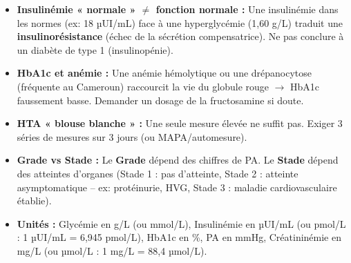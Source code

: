 \documentclass[11pt]{article}
\begin{document}
\begin{attention}
\begin{itemize}
    \item \textbf{Insulinémie « normale » $\neq$ fonction normale :} Une insulinémie dans les normes (ex: 18 µUI/mL) face à une hyperglycémie (1,60 g/L) traduit une \textbf{insulinorésistance} (échec de la sécrétion compensatrice). Ne pas conclure à un diabète de type 1 (insulinopénie).
    \item \textbf{HbA1c et anémie :} Une anémie hémolytique ou une drépanocytose (fréquente au Cameroun) raccourcit la vie du globule rouge $\rightarrow$ HbA1c faussement basse. Demander un dosage de la fructosamine si doute.
    \item \textbf{HTA « blouse blanche » :} Une seule mesure élevée ne suffit pas. Exiger 3 séries de mesures sur 3 jours (ou MAPA/automesure).
    \item \textbf{Grade vs Stade :} Le \textbf{Grade} dépend des chiffres de PA. Le \textbf{Stade} dépend des atteintes d'organes (Stade 1 : pas d'atteinte, Stade 2 : atteinte asymptomatique -- ex: protéinurie, HVG, Stade 3 : maladie cardiovasculaire établie).
    \item \textbf{Unités :} Glycémie en g/L (ou mmol/L), Insulinémie en µUI/mL (ou pmol/L : 1 µUI/mL = 6,945 pmol/L), HbA1c en \%, PA en mmHg, Créatininémie en mg/L (ou µmol/L : 1 mg/L = 88,4 µmol/L).
\end{itemize}
\end{attention}
\end{document}
